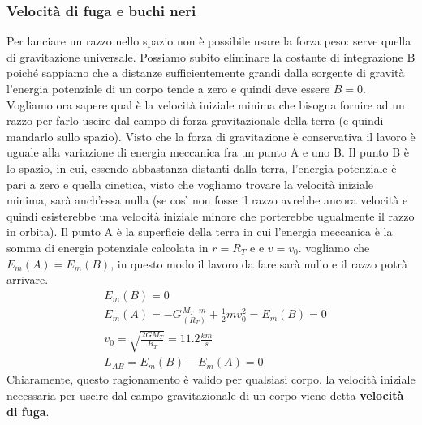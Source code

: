 \documentclass[10pt,a4paper]{article}
\begin{document}
\subsubsection{Velocità di fuga e buchi neri}
 Per lanciare un razzo nello spazio non è possibile usare la forza peso: serve quella di gravitazione universale. Possiamo subito eliminare la costante di integrazione B poiché sappiamo che a distanze sufficientemente grandi dalla sorgente di gravità l'energia potenziale di un corpo tende a zero e quindi deve essere $B=0$. Vogliamo ora sapere qual è la velocità iniziale minima che bisogna fornire ad un razzo per farlo uscire dal campo di forza gravitazionale della terra (e quindi mandarlo sullo spazio). Visto che la forza di gravitazione è conservativa il lavoro è uguale alla variazione di energia meccanica fra un punto A e uno B. Il punto B è lo spazio, in cui, essendo abbastanza distanti dalla terra, l'energia potenziale è pari a zero e quella cinetica, visto che vogliamo trovare la velocità iniziale minima, sarà anch'essa nulla (se così non fosse il razzo avrebbe ancora velocità e quindi esisterebbe una velocità iniziale minore che porterebbe ugualmente il razzo in orbita). Il punto A è la superficie della terra in cui l'energia meccanica è la somma di energia potenziale calcolata in $r =R_T$ e e $v = v_0$. vogliamo che $E_m(A) = E_m(B)$, in questo modo il lavoro da fare sarà nullo e il razzo potrà arrivare. 
 \begin{align*}
 &E_m(B) = 0\\
 &E_m(A) = -G\frac{M_T\cdot m}{(R_T)}+ \frac{1}{2}m v_0^2 = E_m(B) = 0\\
 &v_0 = \sqrt{\frac{2GM_T}{R_T}} = 11.2 \frac{km}{s}\\
 &L_{AB} = E_m(B)-E_m(A) = 0
 \end{align*}
Chiaramente, questo ragionamento è valido per qualsiasi corpo. la velocità iniziale necessaria per uscire dal campo gravitazionale di un corpo viene detta \textbf{velocità di fuga}.\\
\end{document}
